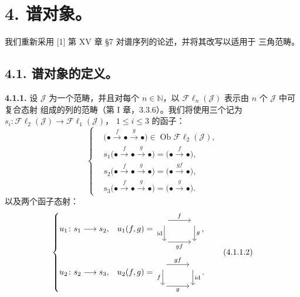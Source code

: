 \clearpage
{}%
\begingroup\small\setlength{\parskip}{0pt}\setlength{\emergencystretch}{1.5em}
\section*{4. 谱对象。}

我们重新采用 [1] 第 XV 章 \S 7 对谱序列的论述，并将其改写以适用于
三角范畴。

\subsection*{4.1. 谱对象的定义。}

\medskip\noindent\textbf{4.1.1.}\quad
设 $\mathcal J$ 为一个范畴，并且对每个 $n\in\mathbb N$，以
$\mathcal{F}\ell_n(\mathcal J)$ 表示由 $n$ 个 $\mathcal J$ 中可复合态射
组成的列的范畴（第 I 章，3.3.6）。我们将使用三个记为
$s_i\colon\mathcal{F}\ell_2(\mathcal J)\to\mathcal{F}\ell_1(\mathcal J)$，
$1\leq i\leq3$ 的函子：
\[
\left\{
\begin{aligned}
&\bigl(\mathord\bullet\xrightarrow f\mathord\bullet\xrightarrow g\mathord\bullet\bigr)
   \in\operatorname{Ob}\mathcal{F}\ell_2(\mathcal J),\\
&s_1\bigl(\mathord\bullet\xrightarrow f\mathord\bullet\xrightarrow g\mathord\bullet\bigr)
   =\bigl(\mathord\bullet\xrightarrow f\mathord\bullet\bigr),\\
&s_2\bigl(\mathord\bullet\xrightarrow f\mathord\bullet\xrightarrow g\mathord\bullet\bigr)
   =\bigl(\mathord\bullet\xrightarrow{gf}\mathord\bullet\bigr),\\
&s_3\bigl(\mathord\bullet\xrightarrow f\mathord\bullet\xrightarrow g\mathord\bullet\bigr)
   =\bigl(\mathord\bullet\xrightarrow g\mathord\bullet\bigr).
\end{aligned}
\right.
\tag{4.1.1.1}
\]
以及两个函子态射：
\[
\left\{
\begin{aligned}
&u_1\colon s_1\longrightarrow s_2,
&&u_1(f,g)=
\begin{tikzcd}[ampersand replacement=\&,column sep=2.8em,row sep=1.9em,baseline=(current bounding box.center)]
{}\arrow[r,"f"]\arrow[d,"\operatorname{id}"']\&{}\arrow[d,"g"]\\
{}\arrow[r,"gf"']\&{}
\end{tikzcd},\\[2pt]
&u_2\colon s_2\longrightarrow s_3,
&&u_2(f,g)=
\begin{tikzcd}[ampersand replacement=\&,column sep=2.8em,row sep=1.9em,baseline=(current bounding box.center)]
{}\arrow[r,"gf"]\arrow[d,"f"']\&{}\arrow[d,"\operatorname{id}"]\\
{}\arrow[r,"g"']\&{}
\end{tikzcd}.
\end{aligned}
\right.
\tag{4.1.1.2}
\]

